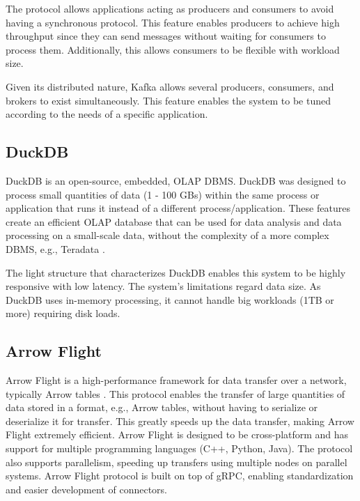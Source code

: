 The protocol allows applications acting as producers and consumers to avoid having a synchronous protocol. This feature enables producers to achieve high throughput since they can send messages without waiting for consumers to process them. Additionally, this allows consumers to be flexible with workload size.

Given its distributed nature, Kafka allows several producers, consumers, and brokers to exist simultaneously. This feature enables the system to be tuned according to the needs of a specific application. 

\subsection{DuckDB}

DuckDB \cite{raasveldtDuckDBEmbeddableAnalytical2019} is an open-source, embedded, \gls{OLAP} \gls{DBMS}. DuckDB was designed to process small quantities of data (1 - 100 GBs) within the same process or application that runs it instead of a different process/application. These features create an efficient \gls{OLAP} database that can be used for data analysis and data processing on a small-scale data, without the complexity of a more complex \gls{DBMS}, e.g., Teradata \cite{shahImproveYourOLAP}. 

The light structure that characterizes DuckDB enables this system to be highly responsive with low latency. The system's limitations regard data size. As DuckDB uses in-memory processing, it cannot handle big workloads (1TB or more) requiring disk loads.

\subsection{Arrow Flight}

Arrow Flight is a high-performance framework for data transfer over a network, typically Arrow tables \cite{wesmIntroducingApacheArrow2019}. This protocol enables the transfer of large quantities of data stored in a format, e.g., Arrow tables, without having to serialize or deserialize it for transfer. This greatly speeds up the data transfer, making Arrow Flight extremely efficient. Arrow Flight is designed to be cross-platform and has support for multiple programming languages (C++, Python, Java). The protocol also supports parallelism, speeding up transfers using multiple nodes on parallel systems. Arrow Flight protocol is built on top of gRPC, enabling standardization and easier development of connectors. 
